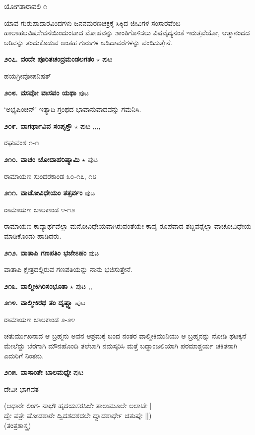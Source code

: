 \hfill ಯೋಗತಾರಾವಲಿ ೧

ಯಾವ ಗುರುಪಾದಾರವಿಂದಗಳು ಜನನಮರಣಚಕ್ರಕ್ಕೆ  ಸಿಕ್ಕಿದ ಜೀವಿಗಳ ಸಂಸಾರವೆಂಬ ಹಾಲಾಹಲವಿಷಸೇವನೆಯಿಂದುಂಟಾದ ಮೋಹವನ್ನು ಶಾಂತಿಗೊಳಿಸಲು ವಿಷವೈದ್ಯನಂತೆ ಇರುತ್ತವೆಯೋ, ಆತ್ಮಾನಂದದ ಅರಿವನ್ನು ತಂದುಕೊಡುವ ಅಂತಹ ಗುರುಗಳ ಅಡಿದಾವರೆಗಳನ್ನು ವಂದಿಸುತ್ತೇನೆ.

\medskip
\noindent\textbf{೨೦೭. ವಂದೇ ಪೂರಿತಚಂದ್ರಮಂಡಲಗತಂ} $\star$ \hfill ಪುಟ \pageref{32a}

\hfill ಹಯಗ್ರೀವೋಪನಿಷತ್

\medskip
\noindent\textbf{೨೦೮. ವಸವೋ ವಾಸವಂ ಯಥಾ} \hfill ಪುಟ \pageref{250e}

\hfill `ಅಭ್ಯಷಿಂಚನ್' ಇತ್ಯಾದಿ ಗ್ರಂಥದ ಭಾವಾನುವಾದವನ್ನು ಗಮನಿಸಿ.

\medskip
\noindent\textbf{೨೦೯. ವಾಗರ್ಥಾವಿವ ಸಂಪೃಕ್ತೌ} $\star$ \hfill ಪುಟ \pageref{21b},\pageref{31b},\pageref{223a},\pageref{234},\pageref{238}

\hfill ರಘುವಂಶ ೧-೧

\medskip
\noindent\textbf{೨೧೦. ವಾಚಂ ಚೋದಾಹರಿಷ್ಯಾಮಿ} $\star$ \hfill ಪುಟ \pageref{232}

\hfill ರಾಮಾಯಣ ಸುಂದರಕಾಂಡ ೩೦-೧೭, ೧೮

\medskip
\noindent\textbf{೨೧೧. ವಾಚೋವಿಧೇಯಂ ತತ್ಸರ್ವಂ} \hfill ಪುಟ \pageref{189a}

\hfill ರಾಮಾಯಣ ಬಾಲಕಾಂಡ ೪-೧೨

ರಾಮಾಯಣ ಕಾವ್ಯಾರ್ಥವೆಲ್ಲಾ ಮನೋವಿಧೇಯವಾಗಿರುವಂತೆಯೇ ಕಾವ್ಯ ರೂಪವಾದ ಶಬ್ದವನ್ನೆಲ್ಲಾ ವಾಚೋವಿಧೇಯ ಮಾಡಿಕೊಂಡು ಹಾಡಿದರು.

\medskip
\noindent\textbf{೨೧೨. ವಾತಾಪಿ ಗಣಪತಿಂ ಭಜೇಽಹಂ} \hfill ಪುಟ \pageref{45}

\hfill ವಾತಾಪಿ ಕ್ಷೇತ್ರದಲ್ಲಿರುವ ಗಣಪತಿಯನ್ನು ನಾನು ಭಜಿಸುತ್ತೇನೆ.

\medskip
\noindent\textbf{೨೧೩. ವಾಲ್ಮೀಕಿಗಿರಿಸಂಭೂತಾ} $\star$ \hfill ಪುಟ \pageref{151a},\pageref{166b},\pageref{174}

\medskip
\noindent\textbf{೨೧೪. ವಾಲ್ಮೀಕಿರಥ ತಂ ದೃಷ್ಟ್ವಾ} \hfill ಪುಟ \pageref{202a}

\hfill ರಾಮಾಯಣ ಬಾಲಕಾಂಡ ೨-೨೪

ಚತುರ್ಮುಖನಾದ ಆ ಬ್ರಹ್ಮನು ಅವನ ಆಶ್ರಮಕ್ಕೆ ಬಂದ ನಂತರ ವಾಲ್ಮೀಕಿಮುನಿಯು ಆ ಬ್ರಹ್ಮನನ್ನು ನೋಡಿ ಥಟಕ್ಕನೆ ಮೇಲೆದ್ದು ಬೆರಗಾಗಿ ಮೌನಹೊಂದಿ  ತಲೆಬಾಗಿ ನಮಸ್ಕರಿಸಿ ಮತ್ತೆ ಬದ್ಧಾಂಜಲಿಯಾಗಿ ಪರಮಾಶ್ಚರ್ಯ ಚಕಿತನಾಗಿ ಎದುರಿಗೆ ನಿಂತನು.

\medskip
\noindent\textbf{೨೧೫. ವಾಸಾಂತೇ ಬಾಲಮಧ್ಯೇ} \hfill ಪುಟ \pageref{29}

\hfill ದೇವೀ ಭಾಗವತ

\begin{shloka}
(ಆಧಾರೇ ಲಿಂಗ- ನಾಭೌ ಹೃದಯಸರಸಿಜೇ ತಾಲುಮೂಲೇ ಲಲಾಟೇ |\\
ದ್ವೇ ಪತ್ರೇ ಷೋಡಶಾರೇ ದ್ವಿದಶದಶದಲೇ ದ್ವಾದಶಾರ್ಧೇ ಚತುಷ್ಕೇ ||)\\
\hfill (ತಂತ್ರಶಾಸ್ತ್ರ)
\end{shloka}

